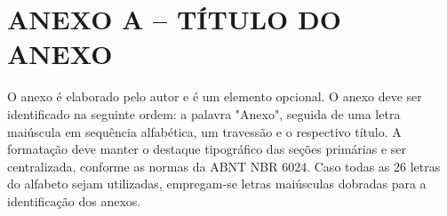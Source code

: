 \documentclass[
	article,             %
	12pt,                %
	oneside,             %
	a4paper,             %
	english,             %
	brazil,              %
	sumario=tradicional
]{abntex2}
\begin{document}
\vspace{\onelineskip}



\chapter*{\textbf{ANEXO A – TÍTULO DO ANEXO}}

O anexo é elaborado pelo autor e é um elemento opcional. O anexo deve ser identificado na seguinte ordem: a palavra "Anexo", seguida de uma letra maiúscula em sequência alfabética, um travessão e o respectivo título. A formatação deve manter o destaque tipográfico das seções primárias e ser centralizada, conforme as normas da ABNT NBR 6024. Caso todas as 26 letras do alfabeto sejam utilizadas, empregam-se letras maiúsculas dobradas para a identificação dos anexos.



\end{document}
